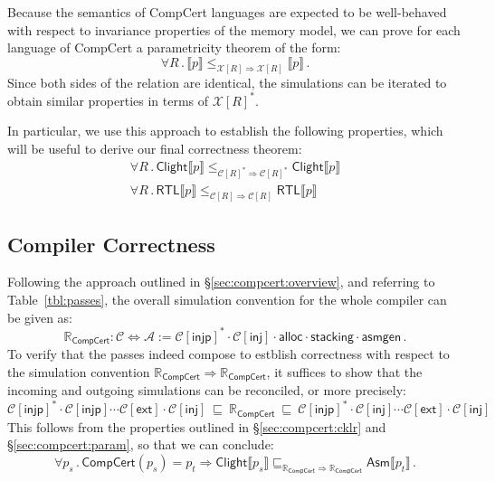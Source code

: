 \documentclass[acmsmall,timestamp,review,anonymous]{acmart}
\newcommand{\kw}[1]{\ensuremath{ \mathsf{#1} }}
\begin{document}
Because the semantics of CompCert languages
are expected to be well-behaved with respect to
invariance properties of the memory model,
we can prove for each language of CompCert
a parametricity theorem of the form:
\[
    \forall R \,.\,
      \llbracket p \rrbracket
        \le_{\mathcal{X}[R] \Rightarrow \mathcal{X}[R]}
      \llbracket p \rrbracket \,.
\]
Since both sides of the relation are identical,
the simulations can be iterated
to obtain similar properties in terms of $\mathcal{X}[R]^*$.

In particular,
we use this approach to establish the following properties,
which will be useful to derive our final correctness theorem:
\begin{gather}
    \forall R \,.\,
      \kw{Clight} \llbracket p \rrbracket
        \le_{\mathcal{C}[R]^* \Rightarrow \mathcal{C}[R]^*}
      \kw{Clight} \llbracket p \rrbracket
      \label{eqn:clight}
      \\
    \forall R \,.\,
      \kw{RTL} \llbracket p \rrbracket
        \le_{\mathcal{C}[R] \Rightarrow \mathcal{C}[R]}
      \kw{RTL} \llbracket p \rrbracket
      \label{eqn:rtl}
\end{gather}


\subsection{Compiler Correctness} %

Following the approach outlined in \S\ref{sec:compcert:overview},
and referring to Table~\ref{tbl:passes},
the overall simulation convention for the whole compiler
can be given as:
\[
  \mathbb{R}_\kw{CompCert} : \mathcal{C} \Leftrightarrow \mathcal{A} :=
    \mathcal{C}[\kw{injp}]^* \cdot
    \mathcal{C}[\kw{inj}] \cdot
    \kw{alloc} \cdot
    \kw{stacking} \cdot
    \kw{asmgen} \,.
\]
To verify that the passes indeed compose to
estblish correctness with respect to the simulation convention
$\mathbb{R}_\kw{CompCert} \Rightarrow \mathbb{R}_\kw{CompCert}$,
it suffices to show that
the incoming and outgoing simulations can be reconciled,
or more precisely:
\[
    \mathcal{C}[\kw{injp}]^* \cdot
    \mathcal{C}[\kw{injp}] \cdots
    \mathcal{C}[\kw{ext}] \cdot
    \mathcal{C}[\kw{inj}]
    \: \sqsubseteq \:
    \mathbb{R}_\kw{CompCert}
    \: \sqsubseteq \:
    \mathcal{C}[\kw{injp}]^* \cdot
    \mathcal{C}[\kw{inj}] \cdots
    \mathcal{C}[\kw{ext}] \cdot
    \mathcal{C}[\kw{inj}] 
\]
This follows from the properties outlined in \S\ref{sec:compcert:cklr}
and \S\ref{sec:compcert:param},
so that we can conclude:
\[
    \forall p_s \,.\,
      \kw{CompCert}(p_s) = p_t \Rightarrow
      \kw{Clight} \llbracket p_s \rrbracket
      \sqsubseteq_{\mathbb{R}_\kw{CompCert} \Rightarrow
                   \mathbb{R}_\kw{CompCert}}
      \kw{Asm} \llbracket p_t \rrbracket \,.
\]
\end{document}
